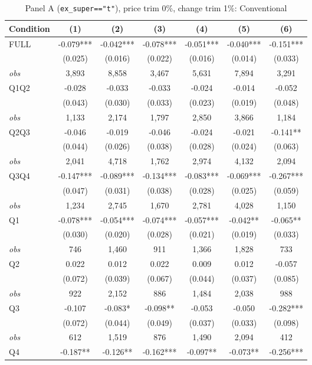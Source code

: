 \documentclass[11pt]{article}
\begin{document}
\begin{table}[!htbp]
\centering
\caption{Panel A (\texttt{ex\_super=="t"}), price trim 0\%, change trim 1\%: Conventional}
\label{tab:a:trim01:conventional}
\small
\begin{tabular}{lcccccc}
\toprule
Condition & (1) & (2) & (3) & (4) & (5) & (6) \\
\midrule
FULL & -0.079*** & -0.042*** & -0.078*** & -0.051*** & -0.040*** & -0.151*** \\
 & (0.025) & (0.016) & (0.022) & (0.016) & (0.014) & (0.033) \\
\textit{obs} & 3,893 & 8,858 & 3,467 & 5,631 & 7,894 & 3,291 \\
Q1Q2 & -0.028 & -0.033 & -0.033 & -0.024 & -0.014 & -0.052 \\
 & (0.043) & (0.030) & (0.033) & (0.023) & (0.019) & (0.048) \\
\textit{obs} & 1,133 & 2,174 & 1,797 & 2,850 & 3,866 & 1,184 \\
Q2Q3 & -0.046 & -0.019 & -0.046 & -0.024 & -0.021 & -0.141** \\
 & (0.044) & (0.026) & (0.038) & (0.028) & (0.024) & (0.063) \\
\textit{obs} & 2,041 & 4,718 & 1,762 & 2,974 & 4,132 & 2,094 \\
Q3Q4 & -0.147*** & -0.089*** & -0.134*** & -0.083*** & -0.069*** & -0.267*** \\
 & (0.047) & (0.031) & (0.038) & (0.028) & (0.025) & (0.059) \\
\textit{obs} & 1,234 & 2,745 & 1,670 & 2,781 & 4,028 & 1,150 \\
Q1 & -0.078*** & -0.054*** & -0.074*** & -0.057*** & -0.042** & -0.065** \\
 & (0.030) & (0.020) & (0.028) & (0.021) & (0.019) & (0.033) \\
\textit{obs} &   746 & 1,460 &   911 & 1,366 & 1,828 &   733 \\
Q2 & 0.022 & 0.012 & 0.022 & 0.009 & 0.012 & -0.057 \\
 & (0.072) & (0.039) & (0.067) & (0.044) & (0.037) & (0.085) \\
\textit{obs} &   922 & 2,152 &   886 & 1,484 & 2,038 &   988 \\
Q3 & -0.107 & -0.083* & -0.098** & -0.053 & -0.050 & -0.282*** \\
 & (0.072) & (0.044) & (0.049) & (0.037) & (0.033) & (0.098) \\
\textit{obs} &   612 & 1,519 &   876 & 1,490 & 2,094 &   412 \\
Q4 & -0.187** & -0.126** & -0.162*** & -0.097** & -0.073** & -0.256*** \\

\end{tabular}
\end{table}
\end{document}
